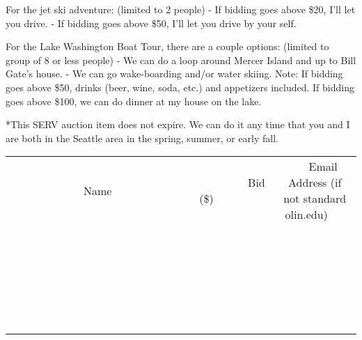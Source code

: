 \documentclass[11pt]{article}
\begin{document}
For the jet ski adventure: (limited to 2 people)
- If bidding goes above \$20, I'll let you drive. 
- If bidding goes above \$50, I'll let you drive by your self.

For the Lake Washington Boat Tour, there are a couple options: (limited to group of 8 or less people)
- We can do a loop around Mercer Island and up to Bill Gate's house. 
- We can go wake-boarding and/or water skiing. 
Note: If bidding goes above \$50, drinks (beer, wine, soda, etc.) and appetizers included. If bidding goes above \$100, we can do dinner at my house on the lake.

*This SERV auction item does not expire. We can do it any time that you and I are both in the Seattle area in the spring, summer, or early fall. \\[6ex]
\begin{tabular}{c c c}
~~~~~~~~~~~~~Name~~~~~~~~~~~~~ & ~~~~~~~~~Bid (\$)~~~~~~~~~ & ~~~Email Address (if not standard olin.edu)~~~ \\
 & & \\
\hline
 & & \\
\hline
 & & \\
\hline
 & & \\
\hline
 & & \\
\hline
 & & \\
\hline
 & & \\
\hline
 & & \\
\hline
 & & \\
\hline
 & & \\
\hline
 & & \\
\hline
 & & \\
\hline
 & & \\
\hline
 & & \\
\hline
 & & \\
\hline
 & & \\
\hline
 & & \\
\hline
 & & \\
\hline
 & & \\
\hline
 & & \\
\hline
 & & \\
\hline
 & & \\
\hline
 & & \\
\hline
 & & \\
\hline
 & & \\
\hline
 & & \\
\hline
\end{tabular}
\clearpage
\end{document}
